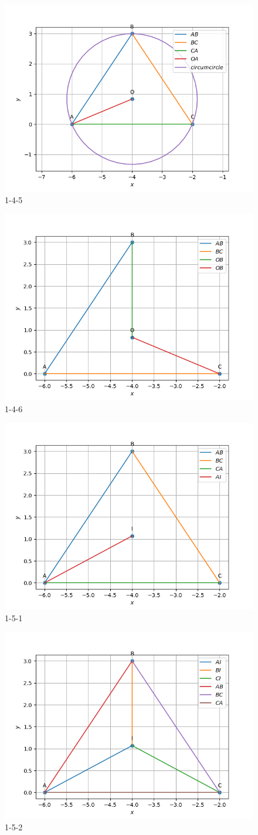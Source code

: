 \documentclass[journal,12pt,onecolumn]{IEEEtran}
\theoremstyle{remark}
\begin{document}
\begin{figure}[!ht]
	\centering
	\includegraphics[width=0.5\columnwidth]{figs/1-4-5.png}
	\caption{1-4-5}
	\label{fig33:Triangle_with_centroid}	
\end{figure}
\begin{figure}[!ht]
	\centering
	\includegraphics[width=0.5\columnwidth]{figs/1-4-6.png}
	\caption{1-4-6}
	\label{fig33:Triangle_with_centroid}	
\end{figure}
\begin{figure}[!ht]
	\centering
	\includegraphics[width=0.5\columnwidth]{figs/1-5-1.png}
	\caption{1-5-1}
	\label{fig33:Triangle_with_centroid}	
\end{figure}
\begin{figure}[!ht]
	\centering
	\includegraphics[width=0.5\columnwidth]{figs/1-5-2.png}
	\caption{1-5-2}
	\label{fig33:Triangle_with_centroid}	
\end{figure}
\end{document}
